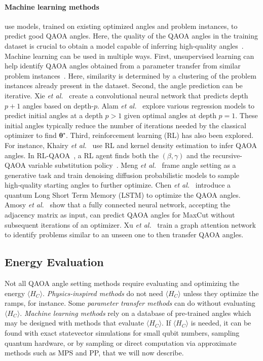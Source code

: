 \documentclass[twocolumn,
english,
aps,
pra,
10pt,
longbibliography,
superscriptaddress,
amsmath,
amssymb,
floatfix
]{revtex4-2}
\begin{document}
\paragraph{Machine learning methods} use models, trained on existing optimized angles and problem instances, to predict good QAOA angles.
Here, the quality of the QAOA angles in the training dataset is crucial to obtain a model capable of inferring high-quality angles~\cite{Liang2024, Tyagin2025}.
Machine learning can be used in multiple ways.
First, unsupervised learning can help identify QAOA angles obtained from a parameter transfer from similar problem instances~\cite{Acampora2023, Moussa2022}.
Here, similarity is determined by a clustering of the problem instances already present in the dataset.
Second, the angle prediction can be iterative.
Xie \emph{et al.}~\cite{Xie2023} create a convolutional neural network that predicts depth $p+1$ angles based on depth-$p$.
Alam \emph{et al.}~\cite{Alam2020} explore various regression models to predict initial angles at a depth $p>1$ given optimal angles at depth $p=1$.
These initial angles typically reduce the number of iterations needed by the classical optimizer to find $\boldsymbol{\theta}^\star$.
Third, reinforcement learning (RL) has also been explored.
For instance, Khairy \emph{et al.}~\cite{Khairy2020} use RL and kernel density estimation to infer QAOA angles.
In RL-QAOA~\cite{Patel2024}, a RL agent finds both the $(\beta, \gamma)$ and the recursive-QAOA variable substitution policy~\cite{Bravyi2020}.
Meng \emph{et al.}~\cite{meng2024parameter} frame angle setting as a generative task and train denoising diffusion probabilistic models to sample high‑quality starting angles to further optimize.
Chen \emph{et al.}~\cite{Chen2025} introduce a quantum Long Short Term Memory (LSTM) to optimize the QAOA angles.
Amosy \emph{et al.}~\cite{Amosy2024-xm} show that a fully connected neural network, accepting the adjacency matrix as input, can predict QAOA angles for MaxCut without subsequent iterations of an optimizer.
Xu \emph{et al.}~\cite{xu2025qaoa} train a graph attention network to identify problems similar to an unseen one to then transfer QAOA angles.

\subsection{Energy Evaluation\label{sec:evaluation}}

Not all QAOA angle setting methods require evaluating and optimizing the energy $\langle H_C\rangle$.
\emph{Physics-inspired methods} do not need $\langle H_C\rangle$ unless they optimize the ramps, for instance.
Some \emph{parameter transfer methods} can do without evaluating $\langle H_C\rangle$. 
\emph{Machine learning methods} rely on a database of pre-trained angles which may be designed with methods that evaluate $\langle H_C\rangle$. 
If $\langle H_C\rangle$ is needed, it can be found with exact statevector simulations for small qubit numbers, sampling quantum hardware, or by sampling or direct computation via approximate methods such as MPS and PP, that we will now describe.
\end{document}
